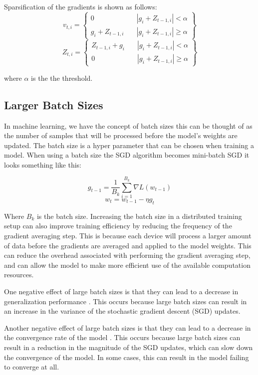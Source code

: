\documentclass[11pt]{article}
\begin{document}
Sparsification of the gradients is shown as follows: 
$$
v_{t,i} =
\left\{
	\begin{array}{cc}
		0 & \quad \left| g_i + Z_{t-1,i}\right| < \alpha \\
		g_i + Z_{t-1,i} & \quad \left| g_i + Z_{t-1,i}\right| \geq \alpha
	\end{array}
\right\}
$$
$$
Z_{t,i} =
\left\{
	\begin{array}{cc}
		Z_{t-1,i} + g_i & \quad \left| g_i + Z_{t-1,i}\right| < \alpha \\
		0	& \quad \left| g_i + Z_{t-1,i}\right| \geq \alpha
	\end{array}
\right\}
$$

where $\alpha$ is the the threshold.


\subsection{Larger Batch Sizes}
In machine learning, we have the concept of batch sizes this can be thought of as the number of samples that will be processed before the model's weights are updated. The batch size is a hyper parameter that can be chosen when training a model. When using a batch size the SGD algorithm becomes mini-batch SGD it looks something like this:

$$
g_{t-1} = \frac{1}{B_k} \sum_{i=1}^{B_k} {\nabla} L(w_{t-1})
$$
$$
w_{t} = w_{t-1} - \eta g_{t}
$$ 


Where $B_k$ is the batch size. Increasing the batch size in a distributed training setup can also improve training efficiency by reducing the frequency of the gradient averaging step. This is because each device will process a larger amount of data before the gradients are averaged and applied to the model weights. This can reduce the overhead associated with performing the gradient averaging step, and can allow the model to make more efficient use of the available computation resources.

One negative effect of large batch sizes is that they can lead to a decrease in generalization performance \cite{keskar2016large}. This occurs because large batch sizes can result in an increase in the variance of the stochastic gradient descent (SGD) updates.

Another negative effect of large batch sizes is that they can lead to a decrease in the convergence rate of the model \cite{goyal2017accurate}. This occurs because large batch sizes can result in a reduction in the magnitude of the SGD updates, which can slow down the convergence of the model. In some cases, this can result in the model failing to converge at all.
\end{document}
